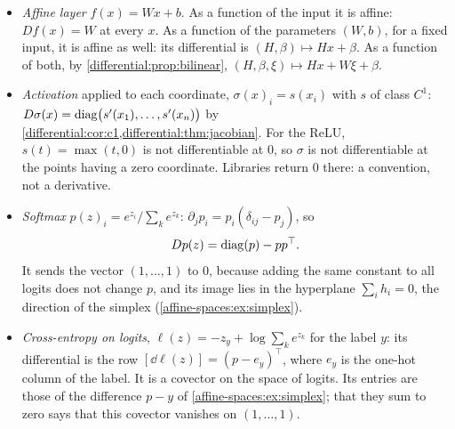 \begin{notechapter}
\begin{mlthread}
\begin{itemize}[nosep]
  \item \emph{Affine layer} $f(x) = Wx + b$. As a function of the input
        it is affine: $Df(x) = W$ at every $x$. As a function of the
        parameters $(W, b)$, for a fixed input, it is affine as well:
        its differential is $(H, \beta)\mapsto Hx + \beta$. As a function
        of both, by \cref{differential:prop:bilinear},
        $(H, \beta, \xi)\mapsto Hx + W\xi + \beta$.
  \item \emph{Activation} applied to each coordinate,
        $\sigma(x)_i = s(x_i)$ with $s$ of class $C^1$:
        $D\sigma(x) = \operatorname{diag}\bigl(s'(x_1),\dots,s'(x_n)\bigr)$ by
        \cref{differential:cor:c1,differential:thm:jacobian}. For the
        ReLU, $s(t) = \max(t, 0)$ is
        not differentiable at $0$, so $\sigma$ is not differentiable at
        the points having a zero coordinate. Libraries return $0$ there:
        a convention, not a derivative.
  \item \emph{Softmax} $p(z)_i = e^{z_i}/\sum_ke^{z_k}$:
        $\partial_jp_i = p_i(\delta_{ij} - p_j)$, so
        \[
          Dp(z) = \operatorname{diag}(p) - pp^\top .
        \]
        It sends the vector $(1,\dots,1)$ to $0$, because adding the same
        constant to all logits does not change $p$, and its image lies in
        the hyperplane $\sum_ih_i = 0$, the direction of the simplex
        (\cref{affine-spaces:ex:simplex}).
  \item \emph{Cross-entropy on logits},
        $\ell(z) = -z_y + \log\sum_ke^{z_k}$ for the label $y$: its
        differential is the row $[\dd\ell(z)] = (p - e_y)^\top$, where
        $e_y$ is the one-hot column of the label. It is a covector on the
        space of logits. Its entries are those of the difference $p - y$
        of \cref{affine-spaces:ex:simplex}; that they sum to zero says
        that this covector vanishes on $(1,\dots,1)$.
\end{itemize}
\end{mlthread}


\end{notechapter}
